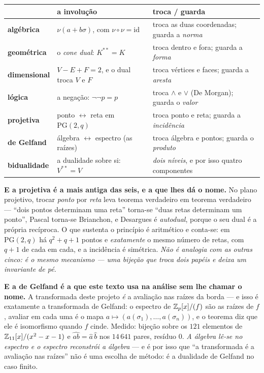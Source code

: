 \documentclass[livro.tex]{subfiles}
\begin{document}
\smallskip
\begin{center}\small
\begin{tabular}{@{}lp{}p{}@{}}
\hline
& \textbf{a involução} & \textbf{troca / guarda} \\
\hline
\textbf{algébrica} & $\nu(a+b\sigma)$, com $\nu\circ\nu=\mathrm{id}$ & troca as duas coordenadas; guarda a \emph{norma} \\
\textbf{geométrica} & o \emph{cone dual}: $K^{**}=K$ & troca dentro e fora; guarda a \emph{forma} \\
\textbf{dimensional} & $V-E+F=2$, e o dual troca $V$ e $F$ & troca vértices e faces; guarda a \emph{aresta} \\
\textbf{lógica} & a negação: $\neg\neg p = p$ & troca $\wedge$ e $\vee$ (De Morgan); guarda o \emph{valor} \\
\textbf{projetiva} & ponto $\leftrightarrow$ reta em $\mathrm{PG}(2,q)$ & troca ponto e reta; guarda a \emph{incidência} \\
\textbf{de Gelfand} & álgebra $\leftrightarrow$ espectro (as raízes) & troca álgebra e pontos; guarda o \emph{produto} \\
\textbf{bidualidade} & a dualidade sobre si: $V^{**}=V$ & \emph{dois níveis}, e por isso quatro componentes \\
\hline
\end{tabular}
\end{center}


\smallskip
\noindent \textbf{E a projetiva é a mais antiga das seis, e a que lhes dá o nome.} No plano
projetivo, trocar \emph{ponto} por \emph{reta} leva teorema verdadeiro em teorema verdadeiro ---
``dois pontos determinam uma reta'' torna-se ``duas retas determinam um ponto'', Pascal torna-se
Brianchon, e Desargues é \emph{autodual}, porque o seu dual é a própria recíproca. O que sustenta o
princípio é aritmético e conta-se: em $\mathrm{PG}(2,q)$ há $q^2+q+1$ pontos e \emph{exatamente} o
mesmo número de retas, com $q+1$ de cada em cada, e a incidência é simétrica. \emph{Não é analogia
com as outras cinco: é o mesmo mecanismo --- uma bijeção que troca dois papéis e deixa um
invariante de pé.}

\smallskip
\noindent \textbf{E a de Gelfand é a que este texto usa na análise sem lhe chamar o nome.} A
transformada deste projeto \emph{é} a avaliação nas raízes da borda --- e isso é exatamente a
transformada de Gelfand: o espectro de $\mathbb Z_p[x]/(f)$ são as raízes de $f$, avaliar em cada uma é o
mapa $a\mapsto(a(\sigma_1),\dots,a(\sigma_n))$, e o teorema diz que ele é isomorfismo quando $f$
cinde. Medido: bijeção sobre os $121$ elementos de $\mathbb Z_{11}[x]/(x^2-x-1)$ e
$\widehat{ab}=\hat a\,\hat b$ nos $14\,641$ pares, resíduo $0$. \emph{A álgebra lê-se no espectro e
o espectro reconstrói a álgebra} --- e é por isso que ``a transformada é a avaliação nas raízes''
não é uma escolha de método: é a dualidade de Gelfand no caso finito.
\end{document}
